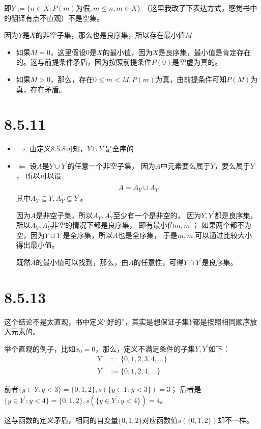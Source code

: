 \documentclass{article}
\begin{document}
即$Y := \{n \in X: P(m) \text{为假},  m \leq n, m \in X  \}$
（这里我改了下表达方式，感觉书中的翻译有点不直观）不是空集。

因为$Y$是$X$的非空子集，那么也是良序集，所以存在最小值$M$

\begin{itemize}
  \item 如果$M = 0$，这里假设$0$是$X$的最小值，因为$X$是良序集，最小值是肯定存在的。这与前提条件矛盾，因为按照前提条件$P(0)$是空虚为真的。
  \item 如果$M > 0$，那么，存在$0 \leq m < M, P(m)$为真，由前提条件可知$P(M)$为真，存在矛盾。
\end{itemize}

\section*{8.5.11}
\begin{itemize}
  \item $\Rightarrow$ 由定义8.5.8可知，$Y \cup Y^\prime$是全序的
  \item $\Leftarrow$ 
        设$A$是$Y \cup Y^\prime$的任意一个非空子集，
        因为$A$中元素要么属于$Y$，要么属于$Y^\prime$，
        所以可以设
        \begin{align*}
          A = A_Y \cup A_Y^\prime
        \end{align*}
        其中$A_Y \subseteq Y, A_Y^\prime \subseteq Y^\prime$。

        因为$A$是非空子集，所以$A_Y, A_Y^\prime$至少有一个是非空的，
        因为$Y, Y^\prime$都是良序集，所以$A_Y, A_Y^\prime$非空的情况下都是良序集，
        即有最小值$m, m^\prime$；
        如果两个都不为空，因为$Y \cup Y^\prime$是全序集，所以$A$也是全序集，
        于是$m, m^\prime$可以通过比较大小
        得出最小值。
        
        既然$A$的最小值可以找到，那么，由$A$的任意性，可得$Y \cap Y^\prime $是良序集。


\end{itemize}

\section*{8.5.13}

\begin{zremark}
  这个结论不是太直观，书中定义“好的”，其实是想保证子集$Y$都是按照相同顺序放入元素的。

  举个直观的例子，比如$x_0 = 0$，那么，定义不满足条件的子集$Y,Y^\prime$如下：
  \begin{align*}
    Y        & := \{0, 1, 2, 3, 4,...\} \\
    Y^\prime & := \{ 0, 1, 2, 4,... \}
  \end{align*}

  前者$\{y \in Y: y < 3\} = \{0, 1, 2\}, s(\{y \in Y: y < 3\}) = 3$；
  后者是$\{y \in Y^\prime: y < 4\} = \{0, 1, 2\}, s(\{y \in Y^\prime: y < 4\}) = 4$。

  这与函数的定义矛盾，相同的自变量$\{0, 1, 2\}$对应函数值$s(\{0, 1, 2\})$却不一样。
\end{zremark}
\end{document}
